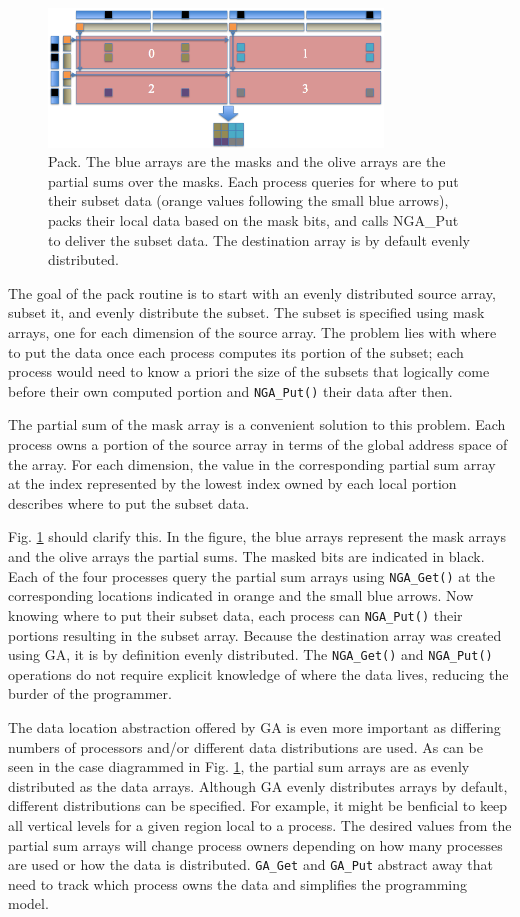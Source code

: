 \begin{figure}[!t]
\center
\includegraphics[width=3.5in]{images/pack}
\caption{Pack.  The blue arrays are the masks and the olive arrays are the
partial sums over the masks.  Each process queries for where to put their
subset data (orange values following the small blue arrows), packs their local
data based on the mask bits, and calls NGA\_Put to deliver the subset data.
The destination array is by default evenly distributed.}
\label{fig:pack}
\end{figure}

The goal of the pack routine is to start with an evenly distributed source
array, subset it, and evenly distribute the subset.  The subset is specified
using mask arrays, one for each dimension of the source array.  The problem
lies with where to put the data once each process computes its portion of the
subset; each process would need to know a priori the size of the subsets that
logically come before their own computed portion and \verb=NGA_Put()= their
data after then.

The partial sum of the mask array is a convenient solution to this problem.
Each process owns a portion of the source array in terms of the global address
space of the array.  For each dimension, the value in the corresponding
partial sum array at the index represented by the lowest index owned by each
local portion describes where to put the subset data.

Fig. \ref{fig:pack} should clarify this.  In the figure, the blue arrays
represent the mask arrays and the olive arrays the partial sums.  The masked
bits are indicated in black.  Each of the four processes query the partial sum
arrays using \verb=NGA_Get()= at the corresponding locations indicated in
orange and the small blue arrows.  Now knowing where to put their subset data,
each process can \verb=NGA_Put()= their portions resulting in the subset
array.  Because the destination array was created using GA, it is by
definition evenly distributed.  The \verb=NGA_Get()= and \verb=NGA_Put()=
operations do not require explicit knowledge of where the data lives, reducing
the burder of the programmer.

The data location abstraction offered by GA is even more important as
differing numbers of processors and/or different data distributions are used.
As can be seen in the case diagrammed in Fig. \ref{fig:pack}, the partial sum
arrays are as evenly distributed as the data arrays.  Although GA evenly
distributes arrays by default, different distributions can be specified.  For
example, it might be benficial to keep all vertical levels for a given region
local to a process.  The desired values from the partial sum arrays will
change process owners depending on how many processes are used or how the data
is distributed.  \verb+GA_Get+ and \verb+GA_Put+ abstract away that need to
track which process owns the data and simplifies the programming model.
